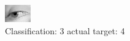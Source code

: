 \begin{figure}[h!]
\begin{center}
\includegraphics[width=0.60\columnwidth]{figures/ID3016_class_3_target_4.png}
\end{center}
\caption{ Classification: 3 actual target: 4}
\label{fig:ID3016_class_3_target_4}
\end{figure}
